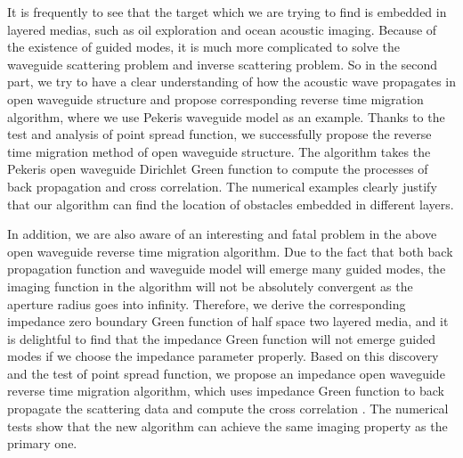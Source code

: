 It is frequently to see that the target which we are trying to find is embedded in layered medias, such as oil exploration and ocean acoustic imaging. Because of the existence of guided modes, it is much more complicated to solve the waveguide scattering problem and inverse scattering problem. So in the second part, we try to have a clear understanding of how the acoustic wave propagates in open waveguide structure and propose corresponding reverse time migration algorithm, where we  use Pekeris waveguide model as an example. Thanks to the test and analysis of point spread function, we successfully propose the reverse time migration method of open waveguide structure. The algorithm takes the Pekeris open waveguide Dirichlet Green function to compute the processes of back propagation and cross correlation. The numerical examples clearly justify that our algorithm can find the location of obstacles embedded in different layers.

In addition, we are also aware of an interesting and fatal problem in the above open waveguide reverse time migration algorithm. Due to the fact that both back propagation function and waveguide model will emerge many guided modes, the imaging function in the algorithm will not be  absolutely convergent as the aperture radius goes into infinity. Therefore,
we derive the corresponding impedance zero boundary Green function of half space two layered media, and it is delightful to find that the impedance Green function will not emerge guided modes if we choose the impedance parameter properly. Based on this discovery and the test of point spread function, we propose an impedance open waveguide reverse time migration algorithm, which uses impedance Green function to back propagate the scattering data and compute the cross correlation . The numerical tests show that the new algorithm can achieve the same imaging property as the primary one.


